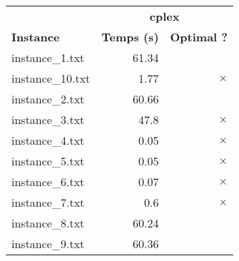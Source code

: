 \documentclass{article}
\begin{document}
\begin{center}
\renewcommand{\arraystretch}{1.4} 
 \begin{tabular}{lrr}
	\hline
 & \multicolumn{2}{c}{\textbf{cplex}}\\
\textbf{Instance}  & \textbf{Temps (s)} & \textbf{Optimal ?} \\\hline

instance\_1.txt & 61.34 & 
\\
instance\_10.txt & 1.77 & 
$\times$
\\
instance\_2.txt & 60.66 & 
\\
instance\_3.txt & 47.8 & 
$\times$
\\
instance\_4.txt & 0.05 & 
$\times$
\\
instance\_5.txt & 0.05 & 
$\times$
\\
instance\_6.txt & 0.07 & 
$\times$
\\
instance\_7.txt & 0.6 & 
$\times$
\\
instance\_8.txt & 60.24 & 
\\
instance\_9.txt & 60.36 & 
\\
\hline\end{tabular}
\end{center}
\end{document}
